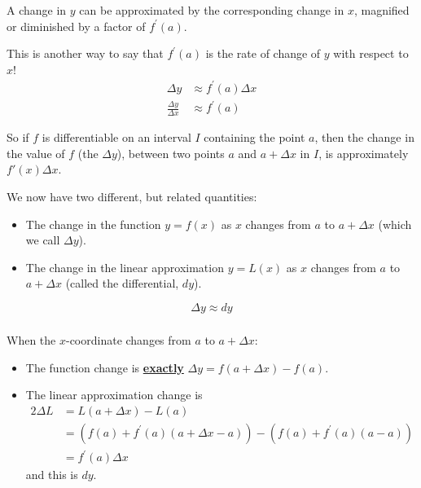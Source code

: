 \documentclass[cal1spr16Lectures.tex]{subfiles}
\begin{document}
\begin{frame}
\footnotesize
A change in $y$ can be approximated by the corresponding change in $x$, magnified or diminished by a factor of $f^{\prime}(a)$.  

\vspace{1pc}
This is another way to say that $f^{\prime}(a)$ is the rate of change of $y$ with respect to $x$!
\begin{align*}
\Delta y & \approx f^{\prime}(a) \Delta x \\[0.5pc]
\frac{\Delta y}{\Delta x} & \approx f^{\prime}(a)
\end{align*}

\vspace{1pc}
So if $f$ is differentiable on an interval $I$ containing the point $a$, then the change in the value of $f$ (the $\Delta y$), between two points $a$ and $a+\Delta x$ in $I$, is \alert{approximately} $f'(x)\Delta x$. 
\end{frame}

\begin{frame}
\small
We now have two different, but related quantities:

\begin{itemize}
\item The change in the function $y=f(x)$ as $x$ changes from $a$ to $a+\Delta x$ (which we call $\Delta y$).

\vspace{0.5pc}
\item The change in the linear approximation $y=L(x)$ as $x$ changes from $a$ to $a+\Delta x$ (called the \alert{differential}, $dy$).
\end{itemize}

\[\Delta y \approx dy\]
\end{frame}

\begin{frame}
\frametitle{}
\small
When the $x$-coordinate changes from $a$ to $a+\Delta x$:
\begin{itemize}
\item The function change is \underline{{\bf exactly}} $\Delta y=f(a+\Delta x)-f(a)$.
\item The linear approximation change is 
\begin{alignat*}{2}
\Delta L &= L(a+\Delta x)-L(a) \\[0.5pc]
&= \left( f(a)+f^{\prime}(a)(a+\Delta x -a) \right) - \left( f(a)+f^{\prime}(a)(a-a) \right) \\[0.5pc]
&= f^{\prime}(a) \Delta x
\end{alignat*}
and this is $dy$.
\end{itemize}
\end{frame}
\end{document}
